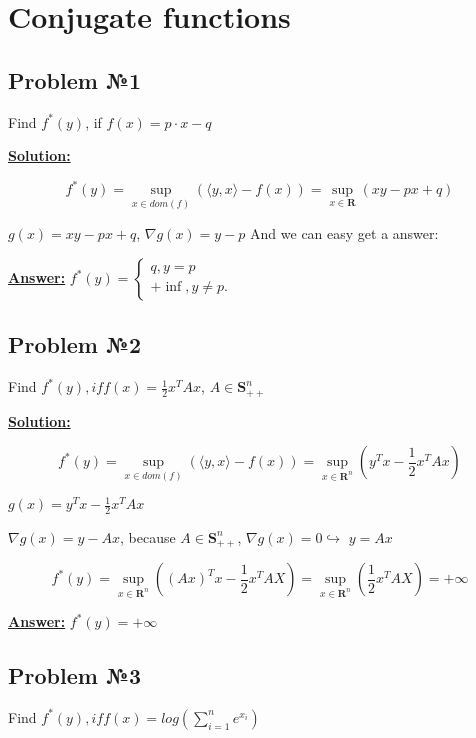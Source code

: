 \section{Conjugate functions}

\subsection{Problem №1} Find $f^*(y)$, if $f(x) = p \cdot x - q$

\underline{\textbf{Solution:}}

\begin{equation*}
    f^*(y) = \sup_{x \in dom(f)} \left( 
    \langle y, x \rangle - f(x) \right) = \sup_{x \in \mathbf{R}} \left( xy - px + q\right)
\end{equation*}

$g(x) = xy - px + q$, $\nabla g(x) = y - p$
And we can easy get a answer:

\underline{\textbf{Answer:}} $f^*(y) = \begin{cases}
   q, y = p \\
   +\inf , y \ne p.
 \end{cases}$

\subsection{Problem №2}
Find $f^*(y), if f(x) = \frac{1}{2}x^TAx$, $A \in \mathbf{S}_{++}^n$

\underline{\textbf{Solution:}}

\begin{equation*}
    f^*(y) = \sup_{x \in dom(f)} \left( 
    \langle y, x \rangle - f(x) \right) = \sup_{x \in \mathbf{R}^n} \left( y^Tx - \frac{1}{2}x^TAx\right)
\end{equation*}

$g(x) = y^Tx - \frac{1}{2}x^TAx$

$\nabla g(x) = y - Ax$, because $A \in \mathbf{S}_{++}^n$, $\nabla g(x) = 0 \hookrightarrow$
$y = Ax$

\begin{equation*}
    f^*(y) = \sup_{x \in \mathbf{R}^n}\left( (Ax)^Tx - \frac{1}{2}x^TAX\right) = \sup_{x \in \mathbf{R}^n}\left( \frac{1}{2}x^TAX\right) = + \infty
\end{equation*}

\underline{\textbf{Answer:}} $f^*(y) = +\infty$

\subsection{Problem №3}
Find $f^*(y), if f(x) = log \left( \sum\limits_{i=1}^n e^{x_i}\right)$

